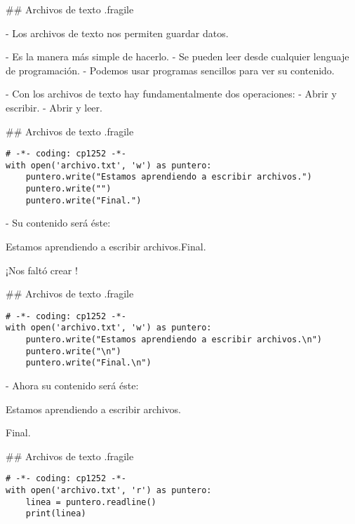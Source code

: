 ## Archivos de texto {.fragile}

- Los archivos de texto nos permiten guardar datos.

- Es la manera más simple de hacerlo.
    - Se pueden leer desde cualquier lenguaje de programación.
    - Podemos usar programas sencillos para ver su contenido.

- Con los archivos de texto hay fundamentalmente dos operaciones:
    - Abrir y escribir.
    - Abrir y leer.

## Archivos de texto {.fragile}


\begin{lstlisting}[style=frame02]
# -*- coding: cp1252 -*-
with open('archivo.txt', 'w') as puntero:
    puntero.write("Estamos aprendiendo a escribir archivos.")
    puntero.write("")
    puntero.write("Final.")
\end{lstlisting}

\pause

- Su contenido será éste:

\begin{exampleFile}
Estamos aprendiendo a escribir archivos.Final.
\end{exampleFile}

\pause
\vfill

\bgnblockdanger
¡Nos faltó crear !
\trmblockdanger


## Archivos de texto {.fragile}


\begin{lstlisting}[style=frame02]
# -*- coding: cp1252 -*-
with open('archivo.txt', 'w') as puntero:
    puntero.write("Estamos aprendiendo a escribir archivos.\n")
    puntero.write("\n")
    puntero.write("Final.\n")
\end{lstlisting}

\pause

- Ahora su contenido será éste:

\begin{exampleFile}
Estamos aprendiendo a escribir archivos.

Final.
\end{exampleFile}

## Archivos de texto {.fragile}


\begin{lstlisting}[style=frame02]
# -*- coding: cp1252 -*-
with open('archivo.txt', 'r') as puntero:
    linea = puntero.readline()
    print(linea)
\end{lstlisting}

